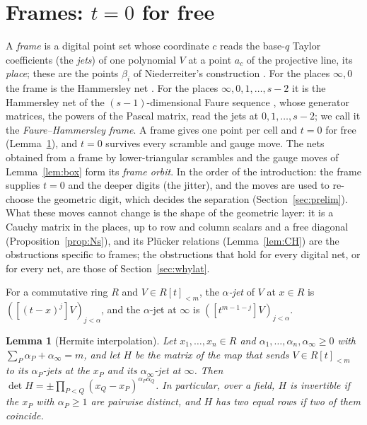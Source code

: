 \documentclass[11pt]{amsart}
\newtheorem{lemma}[theorem]{Lemma}
\theoremstyle{definition}
\theoremstyle{plain}
\begin{document}
\section{Frames: \texorpdfstring{$t=0$}{t=0} for free}\label{sec:frames}
A \emph{frame} is a digital point set whose coordinate $c$ reads the base-$q$ Taylor coefficients (the \emph{jets}) of one polynomial $V$ at a point $a_c$ of the projective line, its \emph{place}; these are the points $\beta_i$ of Niederreiter's construction \cite[Sec.~6]{Nie87}. For the places $\infty,0$ the frame is the Hammersley net \cite{Ham60}. For the places $\infty,0,1,\dots,s-2$ it is the Hammersley net of the $(s-1)$-dimensional Faure sequence \cite{Fau82}, whose generator matrices, the powers of the Pascal matrix, read the jets at $0,1,\dots,s-2$; we call it the \emph{Faure--Hammersley frame}. A frame gives one point per cell and $t=0$ for free (Lemma~\ref{lem:hermite}), and $t=0$ survives every scramble and gauge move. The nets obtained from a frame by lower-triangular scrambles and the gauge moves of Lemma~\ref{lem:box} form its \emph{frame orbit}. In the order of the introduction: the frame supplies $t=0$ and the deeper digits (the jitter), and the moves are used to re-choose the geometric digit, which decides the separation (Section~\ref{sec:prelim}). What these moves cannot change is the shape of the geometric layer: it is a Cauchy matrix in the places, up to row and column scalars and a free diagonal (Proposition~\ref{prop:Ns}), and its Pl\"ucker relations (Lemma~\ref{lem:CH}) are the obstructions specific to frames; the obstructions that hold for every digital net, or for every net, are those of Section~\ref{sec:whylat}.

For a commutative ring $R$ and $V\in R[t]_{<m}$, the \emph{$\alpha$-jet} of $V$ at $x\in R$ is $([(t-x)^j]V)_{j<\alpha}$, and the $\alpha$-jet at $\infty$ is $([t^{m-1-j}]V)_{j<\alpha}$.

\begin{lemma}[Hermite interpolation]\label{lem:hermite}
Let $x_1,\dots,x_n\in R$ and $\alpha_1,\dots,\alpha_n,\alpha_\infty\ge0$ with $\sum_P\alpha_P+\alpha_\infty=m$, and let $H$ be the matrix of the map that sends $V\in R[t]_{<m}$ to its $\alpha_P$-jets at the $x_P$ and its $\alpha_\infty$-jet at $\infty$. Then $\det H=\pm\prod_{P<Q}(x_Q-x_P)^{\alpha_P\alpha_Q}$. In particular, over a field, $H$ is invertible if the $x_P$ with $\alpha_P\ge1$ are pairwise distinct, and $H$ has two equal rows if two of them coincide.
\end{lemma}
\end{document}
